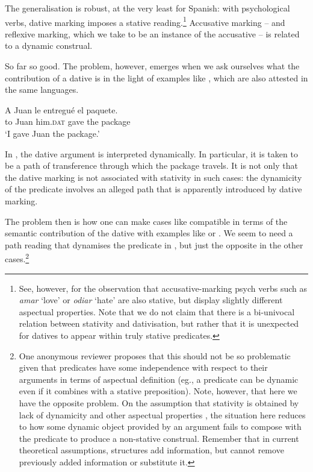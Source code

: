 \documentclass[output=paper,colorlinks,citecolor=brown,nonflat]{langsci/langscibook}
\begin{document}
The generalisation is robust, at the very least for Spanish: with psychological verbs, dative marking imposes a stative reading.\footnote{See, however, \citet{FábregasMarín2015} for the observation that accusative-marking psych verbs such as \textit{amar} `love' or \textit{odiar} `hate' are also stative, but display slightly different aspectual properties. Note that we do not claim that there is a bi-univocal relation between stativity and dativisation, but rather that it is unexpected for datives to appear within truly stative predicates.} Accusative marking – and reflexive marking, which we take to be an instance of the accusative – is related to a dynamic construal.

So far so good. The problem, however, emerges when we ask ourselves what the contribution of a dative is in the light of examples like , which are also attested in the same languages.

\ea%
    \label{ex:fabregas:9}
    \gll    A Juan le       entregué el  paquete.\\
            {to} {Juan} {him.}\textsc{dat}   {gave}    {the} {package}\\
    \glt `I gave Juan the package.'
    \z

In , the dative argument is interpreted dynamically. In particular, it is taken to be a path of transference through which the package travels. It is not only that the dative marking is not associated with stativity in such cases: the dynamicity of the predicate involves an alleged path that is apparently introduced by dative marking.

The problem then is how one can make cases like  compatible in terms of the semantic contribution of the dative with examples like  or . We seem to need a path reading that dynamises the predicate in , but just the opposite in the other cases.\footnote{One anonymous reviewer proposes that this should not be so problematic given that predicates have some independence with respect to their arguments in terms of aspectual definition (eg., a predicate can be dynamic even if it combines with a stative preposition). Note, however, that here we have the opposite problem. On the assumption that stativity is obtained by lack of dynamicity and other aspectual properties \citep{JaqueHidalgo2014}, the situation here reduces to how some dynamic object provided by an argument fails to compose with the predicate to produce a non-stative construal. Remember that in current theoretical assumptions, structures add information, but cannot remove previously added information or substitute it.}
\end{document}
